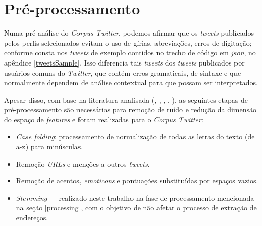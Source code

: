 \documentclass[
	12pt,				%
	oneside,			%
	a4paper,			%
	english,			%
	brazil				%
	]{abntex2ppgsi}
\begin{document}
{{\section{Pré-processamento}
\label{preprocessing}

Numa pré-análise do \textit{Corpus Twitter}, podemos afirmar que os \textit{tweets} publicados pelos perfis selecionados evitam o uso de gírias, abreviações, erros de digitação; conforme consta nos \textit{tweets} de exemplo contidos no trecho de código em \textit{json}, no apêndice \ref{tweetsSample}.  Isso diferencia tais \textit{tweets} dos \textit{tweets} publicados por usuários comuns do \textit{Twitter}, que contém erros gramaticais, de sintaxe e que normalmente dependem de análise contextual para que possam ser interpretados.

Apesar disso, com base na literatura analisada (\cite{Steiger2015Census}, \cite{Middleton2014}, \cite{Kobdani2010}, \cite{Setiawan2017},  \cite{Zagal2016}), as seguintes etapas de pré-processamento são necessárias para remoção de ruído e redução da dimensão do espaço de \textit{features} e foram realizadas para o \textit{Corpus Twitter}:

\begin{itemize}
\item \textit{Case folding}: processamento de normalização de todas as letras do texto (de a-z) para minúsculas.
\item Remoção  \textit{URLs} e menções a outros \textit{tweets}.
\item Remoção de acentos, \textit{emoticons} e pontuações substituídas por espaços vazios.
\item \textit{Stemming} --- realizado neste trabalho na fase de processamento mencionada na seção \ref{processing}, com o objetivo de não afetar o processo de extração de endereços. 
\end{itemize}

}}
\end{document}
